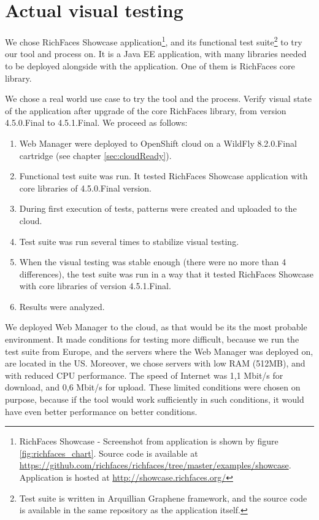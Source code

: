 \documentclass[11pt,oneside,final]{fithesis2}
\begin{document}
  \section{Actual visual testing}
  We chose RichFaces Showcase 
  application\footnote{RichFaces Showcase - Screenshot from application is shown by figure \ref{fig:richfaces_chart}. 
  Source code is available at \url{https://github.com/richfaces/richfaces/tree/master/examples/showcase}. 
  Application is hosted at \url{http://showcase.richfaces.org/}}, 
  and its functional test suite\footnote{Test suite is written in Arquillian Graphene framework, and the source code is 
  available in the same repository as the application itself.} to try our tool and process on. It is a Java EE application, with
  many libraries needed to be deployed alongside with the application. One of them is RichFaces core library.
  
  We chose a real world use case to try the tool and the process. Verify visual state of the application after upgrade of 
  the core RichFaces library, from version 4.5.0.Final to 4.5.1.Final. We proceed as follows:
  
  \begin{enumerate}
   \item Web Manager were deployed to OpenShift cloud on a WildFly 8.2.0.Final cartridge (see chapter \ref{sec:cloudReady}).
   \item Functional test suite was run. It tested RichFaces Showcase application with core libraries of 4.5.0.Final version.
   \item During first execution of tests, patterns were created and uploaded to the cloud.
   \item Test suite was run several times to stabilize visual testing.
   \item When the visual testing was stable enough (there were no more than 4 differences), the test suite was run in a way that it
   tested RichFaces Showcase with core libraries of version 4.5.1.Final.
   \item Results were analyzed.
  \end{enumerate}
  
  We deployed Web Manager to the cloud, as that would be its the most probable environment. It made conditions for testing more
  difficult, because we run the test suite from Europe, and the servers where the Web Manager was deployed on, are located in the US.
  Moreover, we chose servers with low RAM (512MB), and with reduced CPU performance. The speed of Internet was 1,1 Mbit/s
  for download, and 0,6 Mbit/s for upload. These limited conditions were chosen on purpose, because if the tool would work 
  sufficiently in such conditions, it would have even better performance on better conditions.
  
\end{document}
